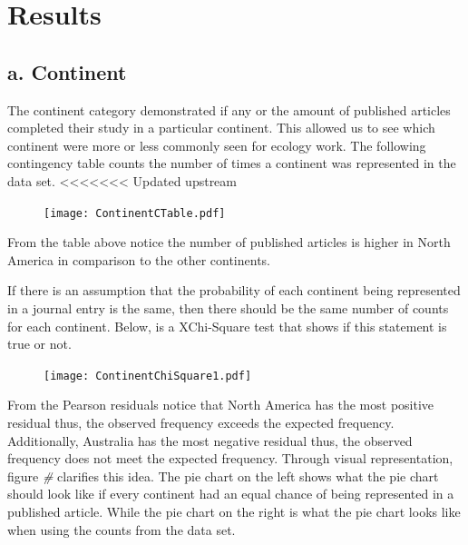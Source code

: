\documentclass[
]{article}
\begin{document}
\hypertarget{results}{%
\section{Results}\label{results}}

\hypertarget{a.-continent}{%
\subsection{a. Continent}\label{a.-continent}}

The continent category demonstrated if any or the amount of published
articles completed their study in a particular continent. This allowed
us to see which continent were more or less commonly seen for ecology
work. The following contingency table counts the number of times a
continent was represented in the data set.
\textless\textless\textless\textless\textless\textless\textless{}
Updated upstream

\begin{figure}
    \centering
    \texttt{[image: ContinentCTable.pdf]}
    \label{fig:Contingency Table}
\end{figure}

From the table above notice the number of published articles is higher
in North America in comparison to the other continents.

If there is an assumption that the probability of each continent being
represented in a journal entry is the same, then there should be the
same number of counts for each continent. Below, is a XChi-Square test
that shows if this statement is true or not.

\begin{figure}
    \centering
    \texttt{[image: ContinentChiSquare1.pdf]}
    \label{fig:Continent XChi-Square}
\end{figure}

From the Pearson residuals notice that North America has the most
positive residual thus, the observed frequency exceeds the expected
frequency. Additionally, Australia has the most negative residual thus,
the observed frequency does not meet the expected frequency. Through
visual representation, figure \emph{\#} clarifies this idea. The pie
chart on the left shows what the pie chart should look like if every
continent had an equal chance of being represented in a published
article. While the pie chart on the right is what the pie chart looks
like when using the counts from the data set.
\end{document}
